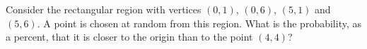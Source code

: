 Consider the rectangular region with vertices $(0,1)$, $(0,6)$, $(5,1)$ and $(5,6)$. A point is chosen at random from this region. What is the probability, as a percent, that it is closer to the origin than to the point $(4,4)$?
